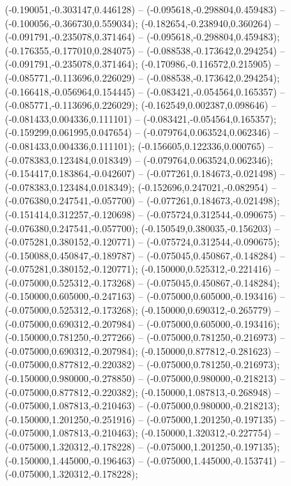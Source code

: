  (-0.190051,-0.303147,0.446128) -- (-0.095618,-0.298804,0.459483) -- (-0.100056,-0.366730,0.559034);
 (-0.182654,-0.238940,0.360264) -- (-0.091791,-0.235078,0.371464) -- (-0.095618,-0.298804,0.459483);
 (-0.176355,-0.177010,0.284075) -- (-0.088538,-0.173642,0.294254) -- (-0.091791,-0.235078,0.371464);
 (-0.170986,-0.116572,0.215905) -- (-0.085771,-0.113696,0.226029) -- (-0.088538,-0.173642,0.294254);
 (-0.166418,-0.056964,0.154445) -- (-0.083421,-0.054564,0.165357) -- (-0.085771,-0.113696,0.226029);
 (-0.162549,0.002387,0.098646) -- (-0.081433,0.004336,0.111101) -- (-0.083421,-0.054564,0.165357);
 (-0.159299,0.061995,0.047654) -- (-0.079764,0.063524,0.062346) -- (-0.081433,0.004336,0.111101);
 (-0.156605,0.122336,0.000765) -- (-0.078383,0.123484,0.018349) -- (-0.079764,0.063524,0.062346);
 (-0.154417,0.183864,-0.042607) -- (-0.077261,0.184673,-0.021498) -- (-0.078383,0.123484,0.018349);
 (-0.152696,0.247021,-0.082954) -- (-0.076380,0.247541,-0.057700) -- (-0.077261,0.184673,-0.021498);
 (-0.151414,0.312257,-0.120698) -- (-0.075724,0.312544,-0.090675) -- (-0.076380,0.247541,-0.057700);
 (-0.150549,0.380035,-0.156203) -- (-0.075281,0.380152,-0.120771) -- (-0.075724,0.312544,-0.090675);
 (-0.150088,0.450847,-0.189787) -- (-0.075045,0.450867,-0.148284) -- (-0.075281,0.380152,-0.120771);
 (-0.150000,0.525312,-0.221416) -- (-0.075000,0.525312,-0.173268) -- (-0.075045,0.450867,-0.148284);
 (-0.150000,0.605000,-0.247163) -- (-0.075000,0.605000,-0.193416) -- (-0.075000,0.525312,-0.173268);
 (-0.150000,0.690312,-0.265779) -- (-0.075000,0.690312,-0.207984) -- (-0.075000,0.605000,-0.193416);
 (-0.150000,0.781250,-0.277266) -- (-0.075000,0.781250,-0.216973) -- (-0.075000,0.690312,-0.207984);
 (-0.150000,0.877812,-0.281623) -- (-0.075000,0.877812,-0.220382) -- (-0.075000,0.781250,-0.216973);
 (-0.150000,0.980000,-0.278850) -- (-0.075000,0.980000,-0.218213) -- (-0.075000,0.877812,-0.220382);
 (-0.150000,1.087813,-0.268948) -- (-0.075000,1.087813,-0.210463) -- (-0.075000,0.980000,-0.218213);
 (-0.150000,1.201250,-0.251916) -- (-0.075000,1.201250,-0.197135) -- (-0.075000,1.087813,-0.210463);
 (-0.150000,1.320312,-0.227754) -- (-0.075000,1.320312,-0.178228) -- (-0.075000,1.201250,-0.197135);
 (-0.150000,1.445000,-0.196463) -- (-0.075000,1.445000,-0.153741) -- (-0.075000,1.320312,-0.178228);
